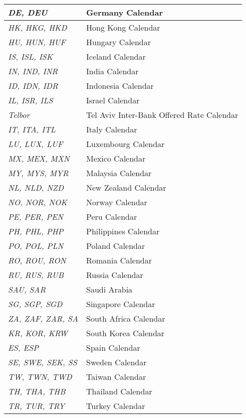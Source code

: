 \begin{longtable}{| p{} | p{} |}
    \emph{DE, DEU} & Germany Calendar \\ \hline
    \emph{HK, HKG, HKD} & Hong Kong Calendar \\ \hline
    \emph{HU, HUN, HUF} & Hungary Calendar \\ \hline
    \emph{IS, ISL, ISK} & Iceland Calendar \\ \hline
    \emph{IN, IND, INR} & India Calendar \\ \hline
    \emph{ID, IDN, IDR} & Indonesia Calendar \\ \hline
    \emph{IL, ISR, ILS} & Israel Calendar \\ \hline
    \emph{Telbor} & Tel Aviv Inter-Bank Offered Rate Calendar \\ \hline
    \emph{IT, ITA, ITL} & Italy Calendar \\ \hline
    \emph{LU, LUX, LUF} & Luxembourg Calendar \\ \hline    
    \emph{MX, MEX, MXN} & Mexico Calendar \\ \hline
    \emph{MY, MYS, MYR} & Malaysia Calendar \\ \hline
    \emph{NL, NLD, NZD} & New Zealand Calendar\\ \hline
    \emph{NO, NOR, NOK} & Norway Calendar \\ \hline
    \emph{PE, PER, PEN} & Peru Calendar \\ \hline
    \emph{PH, PHL, PHP} & Philippines Calendar \\ \hline
    \emph{PO, POL, PLN} & Poland Calendar \\ \hline
    \emph{RO, ROU, RON} & Romania Calendar \\ \hline
    \emph{RU, RUS, RUB} & Russia Calendar \\ \hline
    \emph{SAU, SAR} & Saudi Arabia \\ \hline
    \emph{SG, SGP, SGD} & Singapore Calendar \\ \hline
    \emph{ZA, ZAF, ZAR, SA} & South Africa Calendar \\ \hline    
    \emph{KR, KOR, KRW} & South Korea Calendar \\ \hline
    \emph{ES, ESP} & Spain Calendar \\ \hline
    \emph{SE, SWE, SEK, SS} & Sweden Calendar \\ \hline        
    \emph{TW, TWN, TWD} & Taiwan Calendar \\ \hline
    \emph{TH, THA, THB} & Thailand Calendar \\ \hline
    \emph{TR, TUR, TRY} & Turkey Calendar \\ \hline

\end{longtable}
